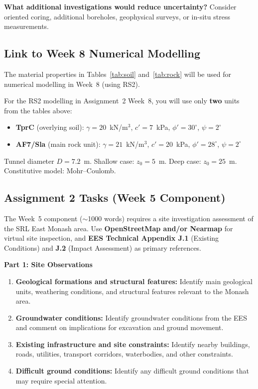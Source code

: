 \documentclass[a4paper,12pt]{article}
\begin{document}
\textbf{What additional investigations would reduce uncertainty?} Consider oriented coring, additional boreholes, geophysical surveys, or in-situ stress measurements.

\subsection{Link to Week 8 Numerical Modelling}
The material properties in Tables~\ref{tab:soil} and~\ref{tab:rock} will be used for numerical modelling in Week~8 (using RS2).

\begin{notebox}
For the RS2 modelling in Assignment~2 Week~8, you will use only \textbf{two} units from the tables above:
\begin{itemize}[nosep]
\item \textbf{TprC} (overlying soil): $\gamma = 20$~kN/m$^3$, $c' = 7$~kPa, $\phi' = 30^\circ$, $\psi = 2^\circ$
\item \textbf{AF7/Sla} (main rock unit): $\gamma = 21$~kN/m$^3$, $c' = 20$~kPa, $\phi' = 28^\circ$, $\psi = 2^\circ$
\end{itemize}
Tunnel diameter $D = 7.2$~m. Shallow case: $z_0 = 5$~m. Deep case: $z_0 = 25$~m. Constitutive model: Mohr--Coulomb.
\end{notebox}

\subsection{Assignment 2 Tasks (Week 5 Component)}
The Week~5 component ($\sim$1000 words) requires a site investigation assessment of the SRL East Monash area. Use \textbf{OpenStreetMap and/or Nearmap} for virtual site inspection, and \textbf{EES Technical Appendix J.1} (Existing Conditions) and \textbf{J.2} (Impact Assessment) as primary references.

\textbf{Part 1: Site Observations}
\begin{enumerate}
    \item[1.1] \textbf{Geological formations and structural features:} Identify main geological units, weathering conditions, and structural features relevant to the Monash area.
    \item[1.2] \textbf{Groundwater conditions:} Identify groundwater conditions from the EES and comment on implications for excavation and ground movement.
    \item[1.3] \textbf{Existing infrastructure and site constraints:} Identify nearby buildings, roads, utilities, transport corridors, waterbodies, and other constraints.
    \item[1.4] \textbf{Difficult ground conditions:} Identify any difficult ground conditions that may require special attention.
\end{enumerate}
\end{document}
